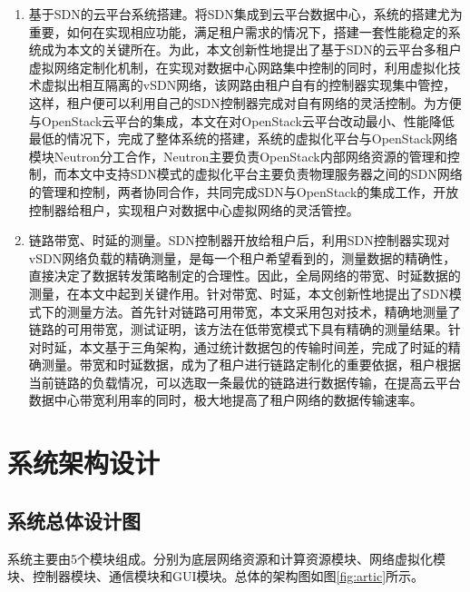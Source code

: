 \begin{enumerate}
\item 基于SDN的云平台系统搭建。将SDN集成到云平台数据中心，系统的搭建尤为重要，如何在实现相应功能，满足租户需求的情况下，搭建一套性能稳定的系统成为本文的关键所在。为此，本文创新性地提出了基于SDN的云平台多租户虚拟网络定制化机制，在实现对数据中心网路集中控制的同时，利用虚拟化技术虚拟出相互隔离的vSDN网络，该网路由租户自有的控制器实现集中管控，这样，租户便可以利用自己的SDN控制器完成对自有网络的灵活控制。为方便与OpenStack云平台的集成，本文在对OpenStack云平台改动最小、性能降低最低的情况下，完成了整体系统的搭建，系统的虚拟化平台与OpenStack网络模块Neutron分工合作，Neutron主要负责OpenStack内部网络资源的管理和控制，而本文中支持SDN模式的虚拟化平台主要负责物理服务器之间的SDN网络的管理和控制，两者协同合作，共同完成SDN与OpenStack的集成工作，开放控制器给租户，实现租户对数据中心虚拟网络的灵活管控。
\item 链路带宽、时延的测量。SDN控制器开放给租户后，利用SDN控制器实现对vSDN网络负载的精确测量，是每一个租户希望看到的，测量数据的精确性，直接决定了数据转发策略制定的合理性。因此，全局网络的带宽、时延数据的测量，在本文中起到关键作用。针对带宽、时延，本文创新性地提出了SDN模式下的测量方法。首先针对链路可用带宽，本文采用包对技术，精确地测量了链路的可用带宽，测试证明，该方法在低带宽模式下具有精确的测量结果。针对时延，本文基于三角架构，通过统计数据包的传输时间差，完成了时延的精确测量。带宽和时延数据，成为了租户进行链路定制化的重要依据，租户根据当前链路的负载情况，可以选取一条最优的链路进行数据传输，在提高云平台数据中心带宽利用率的同时，极大地提高了租户网络的数据传输速率。
\end{enumerate}

\section{系统架构设计}
\subsection{系统总体设计图}
系统主要由5个模块组成。分别为底层网络资源和计算资源模块、网络虚拟化模块、控制器模块、通信模块和GUI模块。总体的架构图如图\ref{fig:artic}所示。

